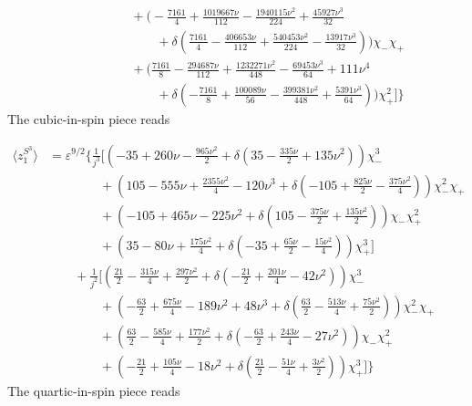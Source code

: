\documentclass[prd,superscriptaddress,preprintnumbers,tightenlines,nofootinbib, eqsecnum]{revtex4-2}
\newcommand{\nn}{\nonumber}
\begin{document}
\begin{align}
   &\qquad\qquad+\Bigg(-\frac{7161}{4}+\frac{1019667 \nu }{112}-\frac{1940115 \nu ^2}{224}+\frac{45927 \nu ^3}{32} \nn\\
   &\qquad\qquad\qquad +\delta 
   \left(\frac{7161}{4}-\frac{406653 \nu }{112}+\frac{540453 \nu ^2}{224}-\frac{13917 \nu ^3}{32}\right)\Bigg) \chi_{-} \chi_{+} \nn\\
   &\qquad\qquad +\Bigg(\frac{7161}{8}-\frac{294687 \nu
   }{112}+\frac{1232271 \nu ^2}{448}-\frac{69453 \nu ^3}{64}+111 \nu ^4 \nn\\
   &\qquad\qquad\qquad +\delta  \left(-\frac{7161}{8}+\frac{100089 \nu }{56}-\frac{399381 \nu ^2}{448}+\frac{5391 \nu ^3}{64}\right)\Bigg) \chi_{+}^2\Bigg]\Bigg\}
\end{align}
The cubic-in-spin piece reads

\begin{align}
    \langle z_1^{S^3} \rangle &=\varepsilon^{9/2}\Bigg\{
    \frac{1}{j^3}\Bigg[\left(-35+260\nu-\frac{965\nu^2}{2}+\delta\left(35-\frac{335\nu}{2}+135\nu^2\right)\right)\chi_{-}^3\nn\\
    &\qquad\qquad+\left(105-555\nu+\frac{2355\nu^2}{4}-120\nu^3+\delta\left(-105+\frac{825\nu}{2}-\frac{375\nu^2}{4}\right)\right)\chi_{-}^2\chi_{+}\nn\\
    &\qquad\qquad+ \left(-105+465\nu-225\nu^2+\delta\left(105-\frac{375\nu}{2}+\frac{135\nu^2}{2}\right)\right)\chi_{-}\chi_{+}^2\nn\\
    &\qquad\qquad+\left(35-80\nu+\frac{175\nu^2}{4}+\delta\left(-35+\frac{65\nu}{2}-\frac{15\nu^2}{4}\right)\right)\chi_{+}^3\Bigg]\nn\\
    &\qquad+\frac{1}{j^2}\Bigg[\left(\frac{21}{2}-\frac{315\nu}{4}+\frac{297\nu^2}{2}+\delta\left(-\frac{21}{2}+\frac{201\nu}{4}-42\nu^2\right)\right)\chi_{-}^3\nn\\
    &\qquad\qquad+\left(-\frac{63}{2}+\frac{675\nu}{4}-189\nu^2+48\nu^3+\delta\left(\frac{63}{2}-\frac{513\nu}{4}+\frac{75\nu^2}{2}\right)\right)\chi_{-}^2\chi_{+}\nn\\
    &\qquad\qquad+\left(\frac{63}{2}-\frac{585\nu}{4}+\frac{177\nu^2}{2}+\delta\left(-\frac{63}{2}+\frac{243\nu}{4}-27\nu^2\right)\right)\chi_{-}\chi_{+}^2\nn\\
    &\qquad\qquad+\left(-\frac{21}{2}+\frac{105\nu}{4}-18\nu^2+\delta\left(\frac{21}{2}-\frac{51\nu}{4}+\frac{3\nu^2}{2}\right)\right)\chi_{+}^3\Bigg]\Bigg\}
\end{align}
The quartic-in-spin piece reads
\end{document}
